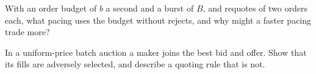 \begin{interviewq}\label{iq:hf:a-venue-playbook:5}
With an order budget of $b$ a second and a burst of $B$, and requotes of two orders each, what pacing uses the budget without rejects, and why might
a faster pacing trade more?
\end{interviewq}

\begin{interviewq}\label{iq:hf:a-venue-playbook:6}
In a uniform-price batch auction a maker joins the best bid and offer. Show that its fills are adversely selected, and describe a quoting rule
that is not.
\end{interviewq}
